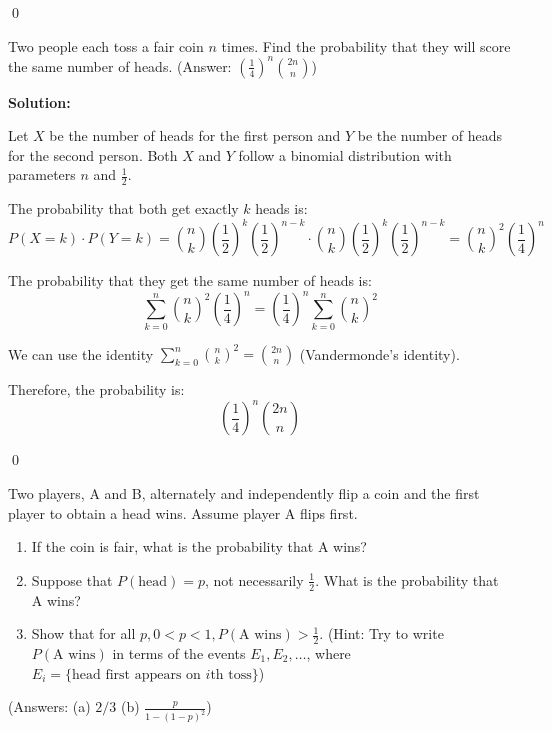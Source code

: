 \qed
\begin{problembox}
Two people each toss a fair coin $n$ times. Find the probability that they will score the same number of heads.
(Answer: $(\frac{1}{4})^{n}\binom{2n}{n}$)
\end{problembox}

\noindent\textbf{Solution:}

Let $X$ be the number of heads for the first person and $Y$ be the number of heads for the second person. Both $X$ and $Y$ follow a binomial distribution with parameters $n$ and $\frac{1}{2}$.

The probability that both get exactly $k$ heads is:
\[ P(X = k) \cdot P(Y = k) = \binom{n}{k} \left(\frac{1}{2}\right)^k \left(\frac{1}{2}\right)^{n-k} \cdot \binom{n}{k} \left(\frac{1}{2}\right)^k \left(\frac{1}{2}\right)^{n-k} = \binom{n}{k}^2 \left(\frac{1}{4}\right)^n \]

The probability that they get the same number of heads is:
\[ \sum_{k=0}^{n} \binom{n}{k}^2 \left(\frac{1}{4}\right)^n = \left(\frac{1}{4}\right)^n \sum_{k=0}^{n} \binom{n}{k}^2 \]

We can use the identity $\sum_{k=0}^{n} \binom{n}{k}^2 = \binom{2n}{n}$ (Vandermonde's identity).

Therefore, the probability is:
\[ \left(\frac{1}{4}\right)^n \binom{2n}{n} \]



\qed
\begin{problembox}
Two players, A and B, alternately and independently flip a coin and the first player to obtain a head wins. Assume player A flips first.
\begin{enumerate}[label=(\alph*)]
    \item If the coin is fair, what is the probability that A wins?
    \item Suppose that $P(\text{head})=p$, not necessarily $\frac{1}{2}$. What is the probability that A wins?
    \item Show that for all $p,0<p<1,P(\text{A wins})>\frac{1}{2}$. (Hint: Try to write $P(\text{A wins})$ in terms of the events $E_{1},E_{2},\ldots$, where $E_{i}=\{\text{head first appears on }i\text{th toss}\}$)
\end{enumerate}
(Answers: (a) $2/3$ (b) $\frac{p}{1-(1-p)^{2}}$)
\end{problembox}


